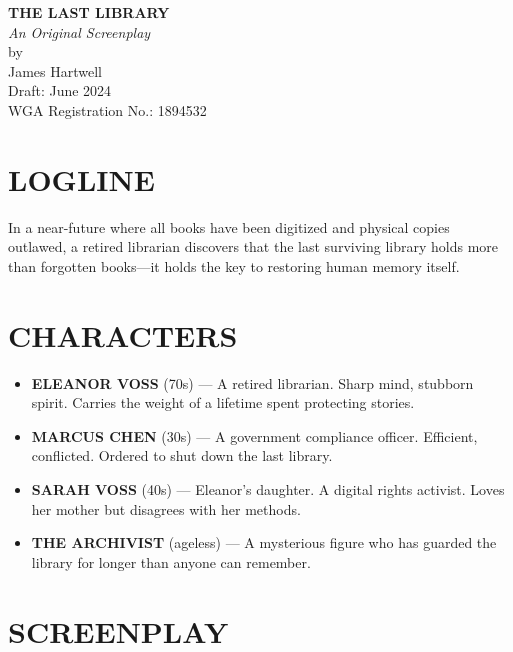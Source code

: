 \documentclass[
    language=english,
    doctype=screenplay,
    institution=none,
]{../../omnilatex}
\begin{document}
\maketitle

\vspace{1cm}

\begin{center}
\textbf{THE LAST LIBRARY}\\[0.5cm]
\textit{An Original Screenplay}\\[0.3cm]
by\\[0.3cm]
James Hartwell\\[1cm]
Draft: June 2024\\
WGA Registration No.: 1894532
\end{center}

\vspace{1cm}

\section*{LOGLINE}

In a near-future where all books have been digitized and physical copies outlawed, a retired librarian discovers that the last surviving library holds more than forgotten books---it holds the key to restoring human memory itself.

\section*{CHARACTERS}

\begin{itemize}
    \item \textbf{ELEANOR VOSS} (70s) --- A retired librarian. Sharp mind, stubborn spirit. Carries the weight of a lifetime spent protecting stories.
    \item \textbf{MARCUS CHEN} (30s) --- A government compliance officer. Efficient, conflicted. Ordered to shut down the last library.
    \item \textbf{SARAH VOSS} (40s) --- Eleanor's daughter. A digital rights activist. Loves her mother but disagrees with her methods.
    \item \textbf{THE ARCHIVIST} (ageless) --- A mysterious figure who has guarded the library for longer than anyone can remember.
\end{itemize}

\section*{SCREENPLAY}
\end{document}
